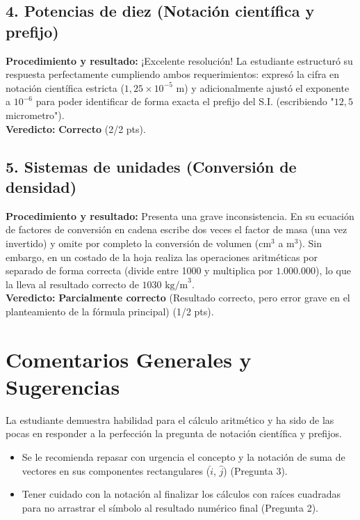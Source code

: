 \documentclass[12pt]{article}
\begin{document}
\subsection*{4. Potencias de diez (Notación científica y prefijo)}
\textbf{Procedimiento y resultado:} ¡Excelente resolución! La estudiante estructuró su respuesta perfectamente cumpliendo ambos requerimientos: expresó la cifra en notación científica estricta ($1,25 \times 10^{-5}$ m) y adicionalmente ajustó el exponente a $10^{-6}$ para poder identificar de forma exacta el prefijo del S.I. (escribiendo "$12,5$ micrometro"). \\
\textbf{Veredicto:} \textbf{Correcto} (2/2 pts).

\subsection*{5. Sistemas de unidades (Conversión de densidad)}
\textbf{Procedimiento y resultado:} Presenta una grave inconsistencia. En su ecuación de factores de conversión en cadena escribe dos veces el factor de masa (una vez invertido) y omite por completo la conversión de volumen ($\text{cm}^3$ a $\text{m}^3$). Sin embargo, en un costado de la hoja realiza las operaciones aritméticas por separado de forma correcta (divide entre 1000 y multiplica por $1.000.000$), lo que la lleva al resultado correcto de $1030 \text{ kg/m}^3$. \\
\textbf{Veredicto:} \textbf{Parcialmente correcto} (Resultado correcto, pero error grave en el planteamiento de la fórmula principal) (1/2 pts).

\vspace{0.5cm}
\section*{Comentarios Generales y Sugerencias}
La estudiante demuestra habilidad para el cálculo aritmético y ha sido de las pocas en responder a la perfección la pregunta de notación científica y prefijos. 
\begin{itemize}
    \item Se le recomienda repasar con urgencia el concepto y la notación de suma de vectores en sus componentes rectangulares ($\hat{i}$, $\hat{j}$) (Pregunta 3).
    \item Tener cuidado con la notación al finalizar los cálculos con raíces cuadradas para no arrastrar el símbolo al resultado numérico final (Pregunta 2).
\end{itemize}
\end{document}
